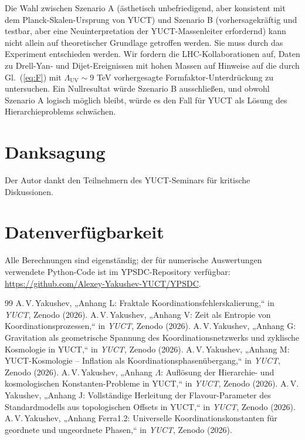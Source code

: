 \documentclass[11pt,a4paper]{article}
\newcommand{\LUV}{\Lambda_{\mathrm{UV}}}
\theoremstyle{remark}
\begin{document}
	Die Wahl zwischen Szenario A (ästhetisch unbefriedigend, aber konsistent mit dem Planck-Skalen-Ursprung von YUCT) und Szenario B (vorhersagekräftig und testbar, aber eine Neuinterpretation der YUCT-Massenleiter erfordernd) kann nicht allein auf theoretischer Grundlage getroffen werden. Sie muss durch das Experiment entschieden werden. Wir fordern die LHC-Kollaborationen auf, Daten zu Drell-Yan- und Dijet-Ereignissen mit hohen Massen auf Hinweise auf die durch Gl.~(\ref{eq:F}) mit \(\LUV \sim 9\) TeV vorhergesagte Formfaktor-Unterdrückung zu untersuchen. Ein Nullresultat würde Szenario B ausschließen, und obwohl Szenario A logisch möglich bleibt, würde es den Fall für YUCT als Lösung des Hierarchieproblems schwächen.
	
	\section*{Danksagung}
	Der Autor dankt den Teilnehmern des YUCT-Seminars für kritische Diskussionen.
	
	\section*{Datenverfügbarkeit}
	Alle Berechnungen sind eigenständig; der für numerische Auswertungen verwendete Python-Code ist im YPSDC-Repository verfügbar: \url{https://github.com/Alexey-Yakushev-YUCT/YPSDC}.
	
	\begin{thebibliography}{99}
		 A.\,V.\,Yakushev, „Anhang L: Fraktale Koordinationsfehlerskalierung,“ in \emph{YUCT}, Zenodo (2026).
		 A.\,V.\,Yakushev, „Anhang V: Zeit als Entropie von Koordinationsprozessen,“ in \emph{YUCT}, Zenodo (2026).
		 A.\,V.\,Yakushev, „Anhang G: Gravitation als geometrische Spannung des Koordinationsnetzwerks und zyklische Kosmologie in YUCT,“ in \emph{YUCT}, Zenodo (2026).
		 A.\,V.\,Yakushev, „Anhang M: YUCT-Kosmologie – Inflation als Koordinationsphasenübergang,“ in \emph{YUCT}, Zenodo (2026).
		 A.\,V.\,Yakushev, „Anhang \(\Lambda\): Auflösung der Hierarchie- und kosmologischen Konstanten-Probleme in YUCT,“ in \emph{YUCT}, Zenodo (2026).
		 A.\,V.\,Yakushev, „Anhang J: Vollständige Herleitung der Flavour-Parameter des Standardmodells aus topologischen Offsets in YUCT,“ in \emph{YUCT}, Zenodo (2026).
		 A.\,V.\,Yakushev, „Anhang Ferra1.2: Universelle Koordinationskonstanten für geordnete und ungeordnete Phasen,“ in \emph{YUCT}, Zenodo (2026).
	\end{thebibliography}
	
\end{document}
